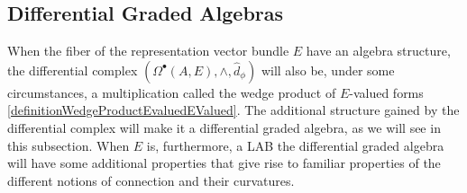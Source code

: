 


\subsection{Differential Graded Algebras}

When the fiber of the representation vector bundle $E$ have an algebra structure, the differential complex $(\Omega^\bullet(A, E), \wedge, \hat d_\phi)$ will also be, under some circumstances, a multiplication called the wedge product of $E$-valued forms \ref{definitionWedgeProductEvaluedEValued}. The additional structure gained by the differential complex will make it a differential graded algebra, as we will see in this subsection. When $E$ is, furthermore, a LAB the differential graded algebra will have some additional properties that give rise to familiar properties of the different notions of connection and their curvatures.

